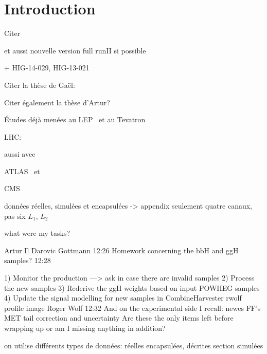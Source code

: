 \section{Introduction}\label{chapter-HTT_analysis-section-introduction}

Citer 

et aussi nouvelle version full runII si possible

+ HIG-14-029, HIG-13-021


Citer la thèse de Gaël:\\

Citer également la thèse d'Artur?\\


Études déjà menées au LEP~\cite{Schael:2006cr} et au Tevatron~\cite{Aaltonen:2009vf,Abazov:2011jh}

LHC: \cite{CMS-PAS-HIG-13-021,CMS-PAS-HIG-14-029,CMS-PAS-HIG-17-020}

aussi avec \quarkb\antiquarkb~\cite{Chatrchyan:2013qga,Khachatryan:2015tra}

ATLAS \mu\mu\ et \tau\tau~\cite{Aad:2012cfr,ATLAS-MSSM-HTT_2018,ATLAS-MSSM-HTT_2020}

CMS \mu\mu~\cite{CMS:2015ooa} \tau\tau~\cite{Chatrchyan:2012vp,CMS-MSSM-HTT_2014,CMS-PAS-HIG-17-020}


données réelles, simulées et encapsulées  -> appendix
seulement quatre canaux, pas six
$L_1$, $L_2$

what were my tasks?

	
Artur Il Darovic Gottmann
12:26
Homework concerning the bbH and ggH samples?
12:28




1) Monitor the production ---> ask in case there are invalid samples
2) Process the new samples
3) Rederive the ggH weights based on input POWHEG samples
4) Update the signal modelling for new samples in CombineHarvester
rwolf profile image	
Roger Wolf
12:32
And on the experimental side I recall:
newes FF's
MET tail correction and uncertainty
Are these the only items left before wrapping up or am I missing anything in addition?

on utilise différents types de données:
réelles
encapsulées, décrites section
simulées